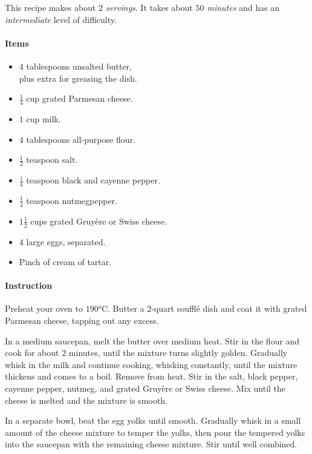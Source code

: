 This recipe makes about \emph{$2$ servings}. It takes about \emph{$50$ minutes} and has an \emph{intermediate} level of difficulty. 

\paragraph{Items}
\begin{itemize}[noitemsep]
	\item[\ding{182}] $4$ tablespoons unsalted butter, \\ plus extra for greasing the dish.
	\item[\ding{183}] $\frac{1}{4}$ cup grated Parmesan cheese.
	\item[\ding{184}] $1$ cup milk.
	\item[\ding{185}] $4$ tablespoons all-purpose flour.
	\item[\ding{186}] $\frac{1}{2}$ teaspoon salt.
	\item[\ding{187}] $\frac{1}{4}$ teaspoon black and cayenne pepper.
	\item[\ding{188}] $\frac{1}{4}$ teaspoon nutmegpepper.
	\item[\ding{189}] $1 \frac{1}{2}$ cups grated Gruyère or Swiss cheese.
	\item[\ding{190}] $4$ large eggs, separated.
	\item[\ding{191}] Pinch of cream of tartar.	
\end{itemize}

\paragraph{Instruction} Preheat your oven to $190$°C. Butter a $2$-quart soufflé dish and coat it with grated Parmesan cheese, tapping out any excess.

In a medium saucepan, melt the butter over medium heat. Stir in the flour and cook for about $2$ minutes, until the mixture turns slightly golden. Gradually whisk in the milk and continue cooking, whisking constantly, until the mixture thickens and comes to a boil. Remove from heat. Stir in the salt, black pepper, cayenne pepper, nutmeg, and grated Gruyère or Swiss cheese. Mix until the cheese is melted and the mixture is smooth.

In a separate bowl, beat the egg yolks until smooth. Gradually whisk in a small amount of the cheese mixture to temper the yolks, then pour the tempered yolks into the saucepan with the remaining cheese mixture. Stir until well combined.

